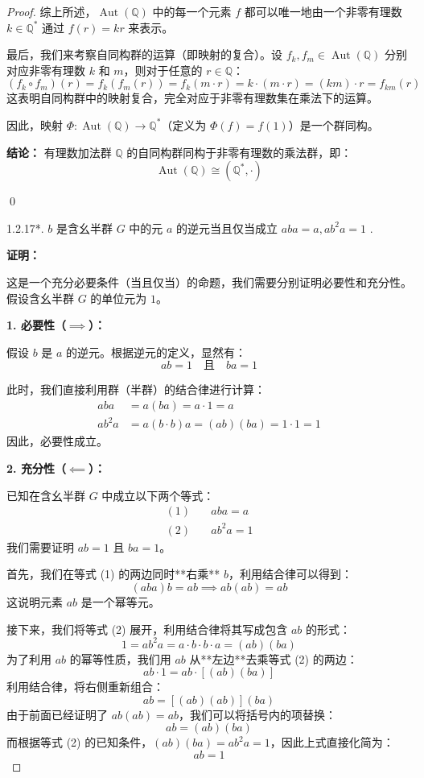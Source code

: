 \documentclass[]{article}
\begin{document}
\begin{proof}
综上所述，$\operatorname{Aut}(\mathbb{Q})$ 中的每一个元素 $f$ 都可以唯一地由一个非零有理数 $k \in \mathbb{Q}^*$ 通过 $f(r) = kr$ 来表示。

最后，我们来考察自同构群的运算（即映射的复合）。设 $f_k, f_m \in \operatorname{Aut}(\mathbb{Q})$ 分别对应非零有理数 $k$ 和 $m$，则对于任意的 $r \in \mathbb{Q}$：
\[ (f_k \circ f_m)(r) = f_k(f_m(r)) = f_k(m \cdot r) = k \cdot (m \cdot r) = (km) \cdot r = f_{km}(r) \]
这表明自同构群中的映射复合，完全对应于非零有理数集在乘法下的运算。

因此，映射 $\Phi: \operatorname{Aut}(\mathbb{Q}) \to \mathbb{Q}^*$（定义为 $\Phi(f) = f(1)$）是一个群同构。

\bigskip
\noindent \textbf{结论：} 有理数加法群 $\mathbb{Q}$ 的自同构群同构于非零有理数的乘法群，即：
\[ \operatorname{Aut}(\mathbb{Q}) \cong (\mathbb{Q}^*, \cdot) \]

\qed

1.2.17*. $b$ 是含幺半群 $G$ 中的元 $a$ 的逆元当且仅当成立 $aba = a, ab^2 a = 1$ . 

\bigskip
\noindent \textbf{证明：} 

这是一个充分必要条件（当且仅当）的命题，我们需要分别证明必要性和充分性。假设含幺半群 $G$ 的单位元为 $1$。

\bigskip
\noindent \textbf{1. 必要性（$\implies$）：}

假设 $b$ 是 $a$ 的逆元。根据逆元的定义，显然有：
\[ ab = 1 \quad \text{且} \quad ba = 1 \]

此时，我们直接利用群（半群）的结合律进行计算：
\begin{align*}
	aba &= a(ba) = a \cdot 1 = a \\
	ab^2 a &= a(b \cdot b)a = (ab)(ba) = 1 \cdot 1 = 1
\end{align*}
因此，必要性成立。

\bigskip
\noindent \textbf{2. 充分性（$\impliedby$）：}

已知在含幺半群 $G$ 中成立以下两个等式：
\begin{align*}
	(1) \quad & aba = a \\
	(2) \quad & ab^2 a = 1
\end{align*}
我们需要证明 $ab = 1$ 且 $ba = 1$。

首先，我们在等式 (1) 的两边同时**右乘** $b$，利用结合律可以得到：
\[ (aba)b = ab \implies ab(ab) = ab \]
这说明元素 $ab$ 是一个幂等元。

接下来，我们将等式 (2) 展开，利用结合律将其写成包含 $ab$ 的形式：
\[ 1 = ab^2 a = a \cdot b \cdot b \cdot a = (ab)(ba) \]
为了利用 $ab$ 的幂等性质，我们用 $ab$ 从**左边**去乘等式 (2) 的两边：
\[ ab \cdot 1 = ab \cdot [ (ab)(ba) ] \]
利用结合律，将右侧重新组合：
\[ ab = [ (ab)(ab) ](ba) \]
由于前面已经证明了 $ab(ab) = ab$，我们可以将括号内的项替换：
\[ ab = (ab)(ba) \]
而根据等式 (2) 的已知条件，$(ab)(ba) = ab^2 a = 1$，因此上式直接化简为：
\[ ab = 1 \]


\end{proof}
\end{document}
